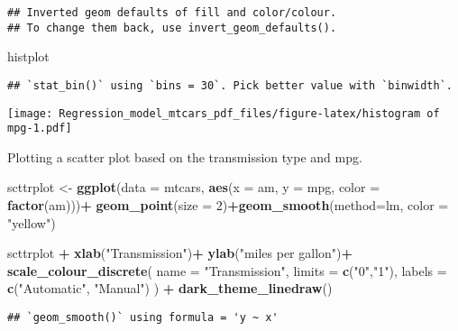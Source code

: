 \documentclass[
]{article}
\newenvironment{Shaded}{\begin{snugshade}}{\end{snugshade}}
\newcommand{\AttributeTok}[1]{\textcolor[rgb]{0.13,0.29,0.53}{#1}}
\newcommand{\DecValTok}[1]{\textcolor[rgb]{0.00,0.00,0.81}{#1}}
\newcommand{\FunctionTok}[1]{\textcolor[rgb]{0.13,0.29,0.53}{\textbf{#1}}}
\newcommand{\NormalTok}[1]{#1}
\newcommand{\OtherTok}[1]{\textcolor[rgb]{0.56,0.35,0.01}{#1}}
\newcommand{\SpecialCharTok}[1]{\textcolor[rgb]{0.81,0.36,0.00}{\textbf{#1}}}
\newcommand{\StringTok}[1]{\textcolor[rgb]{0.31,0.60,0.02}{#1}}
\begin{document}
\begin{verbatim}
## Inverted geom defaults of fill and color/colour.
## To change them back, use invert_geom_defaults().
\end{verbatim}

\begin{Shaded}
\begin{Highlighting}[]
\NormalTok{histplot}
\end{Highlighting}
\end{Shaded}

\begin{verbatim}
## `stat_bin()` using `bins = 30`. Pick better value with `binwidth`.
\end{verbatim}

\texttt{[image: Regression\_model\_mtcars\_pdf\_files/figure-latex/histogram of mpg-1.pdf]}

Plotting a scatter plot based on the transmission type and mpg.

\begin{Shaded}
\begin{Highlighting}[]
\NormalTok{scttrplot }\OtherTok{\textless{}{-}} \FunctionTok{ggplot}\NormalTok{(}\AttributeTok{data =}\NormalTok{ mtcars,}
                    \FunctionTok{aes}\NormalTok{(}\AttributeTok{x =}\NormalTok{ am, }\AttributeTok{y =}\NormalTok{ mpg, }\AttributeTok{color =} \FunctionTok{factor}\NormalTok{(am)))}\SpecialCharTok{+} 
    \FunctionTok{geom\_point}\NormalTok{(}\AttributeTok{size =} \DecValTok{2}\NormalTok{)}\SpecialCharTok{+}\FunctionTok{geom\_smooth}\NormalTok{(}\AttributeTok{method=}\NormalTok{lm, }\AttributeTok{color =} \StringTok{"yellow"}\NormalTok{)}

\NormalTok{scttrplot }\SpecialCharTok{+}
    \FunctionTok{xlab}\NormalTok{(}\StringTok{"Transmission"}\NormalTok{)}\SpecialCharTok{+}
    \FunctionTok{ylab}\NormalTok{(}\StringTok{"miles per gallon"}\NormalTok{)}\SpecialCharTok{+}
    \FunctionTok{scale\_colour\_discrete}\NormalTok{(}
        \AttributeTok{name =} \StringTok{"Transmission"}\NormalTok{,}
        \AttributeTok{limits =} \FunctionTok{c}\NormalTok{(}\StringTok{"0"}\NormalTok{,}\StringTok{"1"}\NormalTok{),}
        \AttributeTok{labels =} \FunctionTok{c}\NormalTok{(}\StringTok{"Automatic"}\NormalTok{,}
                   \StringTok{"Manual"}\NormalTok{)}
\NormalTok{    ) }\SpecialCharTok{+} \FunctionTok{dark\_theme\_linedraw}\NormalTok{()}
\end{Highlighting}
\end{Shaded}

\begin{verbatim}
## `geom_smooth()` using formula = 'y ~ x'
\end{verbatim}
\end{document}
